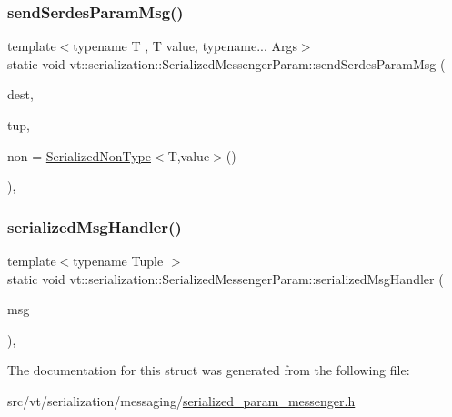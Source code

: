 \subsubsection{\texorpdfstring{send\+Serdes\+Param\+Msg()}{sendSerdesParamMsg()}}
{\footnotesize\ttfamily template$<$typename T , T value, typename... Args$>$ \\
static void vt\+::serialization\+::\+Serialized\+Messenger\+Param\+::send\+Serdes\+Param\+Msg (\begin{DoxyParamCaption}\item[{\hyperlink{namespacevt_a866da9d0efc19c0a1ce79e9e492f47e2}{Node\+Type} const \&}]{dest,  }\item[{std\+::tuple$<$ Args... $>$}]{tup,  }\item[{\hyperlink{namespacevt_1_1serialization_a834e21f3294a160fc6545a1bfc3044af}{Serialized\+Non\+Type}$<$ T, value $>$ \+\_\+\+\_\+attribute\+\_\+\+\_\+((unused))}]{non = {\ttfamily \hyperlink{namespacevt_1_1serialization_a834e21f3294a160fc6545a1bfc3044af}{Serialized\+Non\+Type}$<$T,value$>$()} }\end{DoxyParamCaption})\hspace{0.3cm}{\ttfamily [inline]}, {\ttfamily [static]}}

\mbox{\label{structvt_1_1serialization_1_1_serialized_messenger_param_a0261b2a57c877a3027bb1eb4da6a5bbe}} 
\subsubsection{\texorpdfstring{serialized\+Msg\+Handler()}{serializedMsgHandler()}}
{\footnotesize\ttfamily template$<$typename Tuple $>$ \\
static void vt\+::serialization\+::\+Serialized\+Messenger\+Param\+::serialized\+Msg\+Handler (\begin{DoxyParamCaption}\item[{\hyperlink{structvt_1_1serialization_1_1_serialized_messenger_param_af2ef71832c01ccb24597e82d032b37ab}{Msg\+Type}$<$ Tuple $>$ $\ast$}]{msg }\end{DoxyParamCaption})\hspace{0.3cm}{\ttfamily [inline]}, {\ttfamily [static]}}



The documentation for this struct was generated from the following file\+:\begin{DoxyCompactItemize}
\item 
src/vt/serialization/messaging/\hyperlink{serialized__param__messenger_8h}{serialized\+\_\+param\+\_\+messenger.\+h}\end{DoxyCompactItemize}
